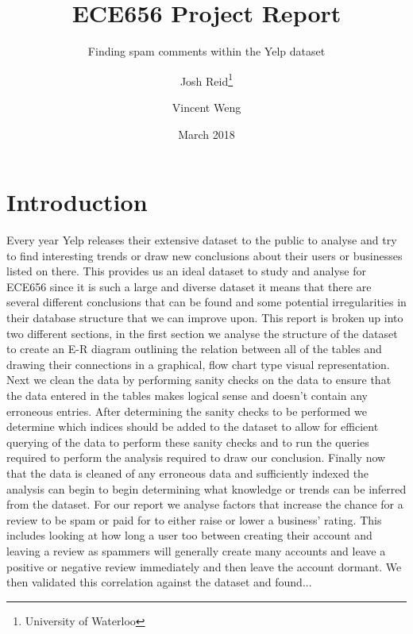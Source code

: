 \documentclass[12pt]{scrbook}
\title{ECE656 Project Report}
\subtitle{Finding spam comments within the Yelp dataset}
\date{March 2018}
\author{Josh Reid\thanks{University of Waterloo}
\and Vincent Weng\footnotemark[1]}
\begin{document}
\maketitle
\section{Introduction}
Every year Yelp releases their extensive dataset to the public to analyse and try to find interesting
trends or draw new conclusions about their users or businesses listed on there.
This provides us an ideal dataset to study and analyse for ECE656 since it is such a large and diverse
dataset it means that there are several different conclusions that can be found and some potential
irregularities in their database structure that we can improve upon.
This report is broken up into two different sections, in the first section we analyse the structure
of the dataset to create an E-R diagram outlining the relation between all of the tables and drawing
their connections in a graphical, flow chart type visual representation.
Next we clean the data by performing sanity checks on the data to ensure that the data entered in the
tables makes logical sense and doesn't contain any erroneous entries.
After determining the sanity checks to be performed we determine which indices should be added to the
dataset to allow for efficient querying of the data to perform these sanity checks and to run the queries
required to perform the analysis required to draw our conclusion.
Finally now that the data is cleaned of any erroneous data and sufficiently indexed the analysis can
begin to begin determining what knowledge or trends can be inferred from the dataset.
For our report we analyse factors that increase the chance for a review to be spam or paid for to
either raise or lower a business' rating.
This includes looking at how long a user too between creating their account and leaving a review as
spammers will generally create many accounts and leave a positive or negative review immediately and then
leave the account dormant.
We then validated this correlation against the dataset and found...
\end{document}
